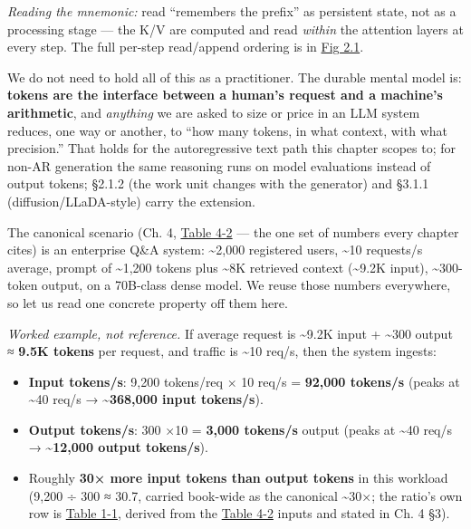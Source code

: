 \emph{Reading the mnemonic:} read ``remembers the prefix'' as persistent
state, not as a processing stage --- the K/V are computed and read
\emph{within} the attention layers at every step. The full per-step
read/append ordering is in \hyperref[fig:2.1]{Fig 2.1}.

We do not need to hold all of this as a practitioner. The durable mental
model is: \textbf{tokens are the interface between a human's request and
a machine's arithmetic}, and \emph{anything} we are asked to size or
price in an LLM system reduces, one way or another, to ``how many
tokens, in what context, with what precision.'' That holds for the
autoregressive text path this chapter scopes to; for non-AR generation
the same reasoning runs on model evaluations instead of output tokens;
§2.1.2 (the work unit changes with the generator) and §3.1.1
(diffusion/LLaDA-style) carry the extension.

\label{worked-example}


The canonical scenario (Ch. 4, \hyperref[tab:4.2]{Table 4-2} --- the one set of numbers
every chapter cites) is an enterprise Q\&A system: \textasciitilde2,000
registered users, \textasciitilde10 requests/s average, prompt of
\textasciitilde1,200 tokens plus \textasciitilde8K retrieved context
(\textasciitilde9.2K input), \textasciitilde300-token output, on a
70B-class dense model. We reuse those numbers everywhere, so let us read
one concrete property off them here.

\emph{Worked example, not reference.} If average request is
\textasciitilde9.2K input + \textasciitilde300 output ≈ \textbf{9.5K
tokens} per request, and traffic is \textasciitilde10 req/s, then the
system ingests:

\begin{itemize}
\tightlist
\item
  \textbf{Input tokens/s}: 9,200 tokens/req × 10 req/s = \textbf{92,000
  tokens/s} (peaks at \textasciitilde40 req/s →
  \textbf{\textasciitilde368,000 input tokens/s}).
\item
  \textbf{Output tokens/s}: 300 ×10 = \textbf{3,000 tokens/s} output
  (peaks at \textasciitilde40 req/s → \textbf{\textasciitilde12,000
  output tokens/s}).
\item
  Roughly \textbf{30× more input tokens than output tokens} in this
  workload (9,200 ÷ 300 ≈ 30.7, carried book-wide as the canonical
  \textasciitilde30×; the ratio's own row is \hyperref[tab:1.1]{Table 1-1}, derived from the
  \hyperref[tab:4.2]{Table 4-2} inputs and stated in Ch. 4 §3).
\end{itemize}

